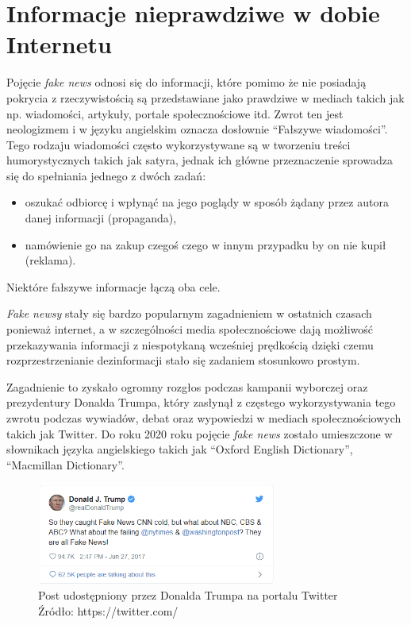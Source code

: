 \chapter{Informacje nieprawdziwe w dobie Internetu}
Pojęcie \textit{fake news} odnosi się do 
informacji, które pomimo że nie posiadają pokrycia z rzeczywistością są
przedstawiane jako prawdziwe w mediach takich jak np. wiadomości, artykuły, 
portale społecznościowe itd.
Zwrot ten jest neologizmem i w języku angielskim oznacza dosłownie ``Fałszywe wiadomości''.
Tego rodzaju wiadomości często wykorzystywane są w tworzeniu treści humorystycznych 
takich jak satyra, jednak ich główne przeznaczenie sprowadza się do spełniania jednego z dwóch zadań:
\begin{itemize}
    \item oszukać odbiorcę i wpłynąć na jego poglądy w sposób żądany przez autora danej informacji (propaganda),
    \item namówienie go na zakup czegoś czego w innym przypadku by on nie kupił (reklama).
\end{itemize} 
Niektóre fałszywe informacje łączą oba cele.

\textit{Fake newsy} stały się bardzo popularnym zagadnieniem w ostatnich czasach ponieważ
internet, a w szczególności media społecznościowe dają możliwość przekazywania
informacji z niespotykaną wcześniej prędkością dzięki czemu rozprzestrzenianie 
dezinformacji stało się zadaniem stosunkowo prostym.

Zagadnienie to zyskało ogromny rozgłos podczas kampanii wyborczej oraz
prezydentury Donalda Trumpa, który zasłynął z częstego wykorzystywania 
tego zwrotu podczas wywiadów, debat oraz wypowiedzi w mediach społecznościowych
takich jak Twitter.
Do roku 2020 roku pojęcie \textit{fake news} zostało umieszczone w słownikach języka angielskiego
takich jak ``Oxford English Dictionary'', ``Macmillan Dictionary''.
\begin{figure}[h!]
    \centering
    \includegraphics[width=0.7\textwidth]{./Img/Trump-Fake-News.png}
    \caption{Post udostępniony przez Donalda Trumpa na portalu Twitter Źródło: https://twitter.com/}
\end{figure}

